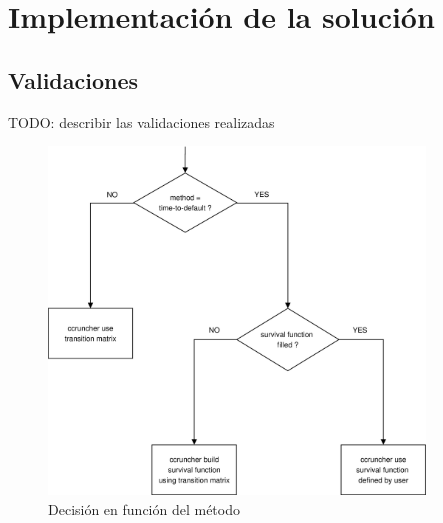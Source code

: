 
%
%
%
%
%
%
%
%

\chapter{Implementaci\'on de la soluci\'on}
\label{sec:implementation}

\section{Validaciones}

TODO: describir las validaciones realizadas


\begin{figure}[!hb]
\begin{center}
\includegraphics[width=10cm,angle=0]{./images/decisiontree1.eps}
\caption{Decisi\'on en funci\'on del m\'etodo}
\label{functionsIJ}
\end{center}
\end{figure}

